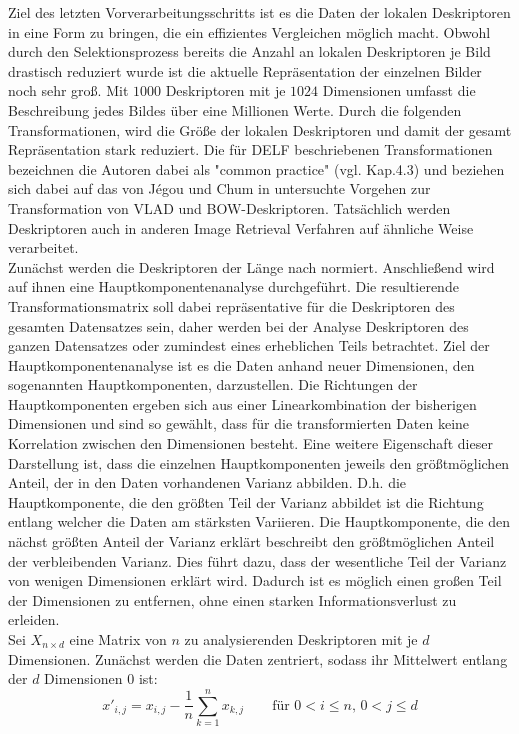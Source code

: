 Ziel des letzten Vorverarbeitungsschritts ist es die Daten der lokalen Deskriptoren in eine Form zu bringen, die ein effizientes Vergleichen möglich macht. Obwohl durch den Selektionsprozess bereits die Anzahl an lokalen Deskriptoren je Bild drastisch reduziert wurde ist die aktuelle Repräsentation der einzelnen Bilder noch sehr groß. Mit $1000$ Deskriptoren mit je $1024$ Dimensionen umfasst die Beschreibung jedes Bildes über eine Millionen Werte. Durch die folgenden Transformationen, wird die Größe der lokalen Deskriptoren und damit der gesamt Repräsentation stark reduziert. Die für DELF beschriebenen Transformationen bezeichnen die Autoren dabei als "common practice" (vgl. \cite{delf} Kap.4.3) und beziehen sich dabei auf das von Jégou und Chum in \cite{common_practice} untersuchte Vorgehen zur Transformation von VLAD und BOW-Deskriptoren. Tatsächlich werden Deskriptoren auch in anderen Image Retrieval Verfahren \cite{convnet} \cite{one} auf ähnliche Weise verarbeitet.
\\
Zunächst werden die Deskriptoren der Länge nach normiert. Anschließend wird auf ihnen eine Hauptkomponentenanalyse durchgeführt. Die resultierende Transformationsmatrix soll dabei repräsentative für die Deskriptoren des gesamten Datensatzes sein, daher werden bei der Analyse Deskriptoren des ganzen Datensatzes oder zumindest eines erheblichen Teils betrachtet. Ziel der Hauptkomponentenanalyse ist es die Daten anhand neuer Dimensionen, den sogenannten Hauptkomponenten, darzustellen. Die Richtungen der Hauptkomponenten ergeben sich aus einer Linearkombination der bisherigen Dimensionen und sind so gewählt, dass für die transformierten Daten keine Korrelation zwischen den Dimensionen besteht. Eine weitere Eigenschaft dieser Darstellung ist, dass die einzelnen Hauptkomponenten jeweils den größtmöglichen Anteil, der in den Daten vorhandenen Varianz abbilden. D.h. die Hauptkomponente, die den größten Teil der Varianz abbildet ist die Richtung entlang welcher die Daten am stärksten Variieren. Die Hauptkomponente, die den nächst größten Anteil der Varianz erklärt beschreibt den größtmöglichen Anteil der verbleibenden Varianz. Dies führt dazu, dass der wesentliche Teil der Varianz von wenigen Dimensionen erklärt wird. Dadurch ist es möglich einen großen Teil der Dimensionen zu entfernen, ohne einen starken Informationsverlust zu erleiden.
\\
Sei $X_{n\times d}$ eine Matrix von $n$ zu analysierenden Deskriptoren mit je $d$ Dimensionen. 
Zunächst werden die Daten zentriert, sodass ihr Mittelwert entlang der $d$ Dimensionen $0$ ist:
\begin{equation}
x'_{i,j} = x_{i,j}-\frac{1}{n}\sum_{k=1}^n{x_{k,j}}\qquad \text{für }0<i\leq n\text{, }0<j\leq d
\end{equation}


